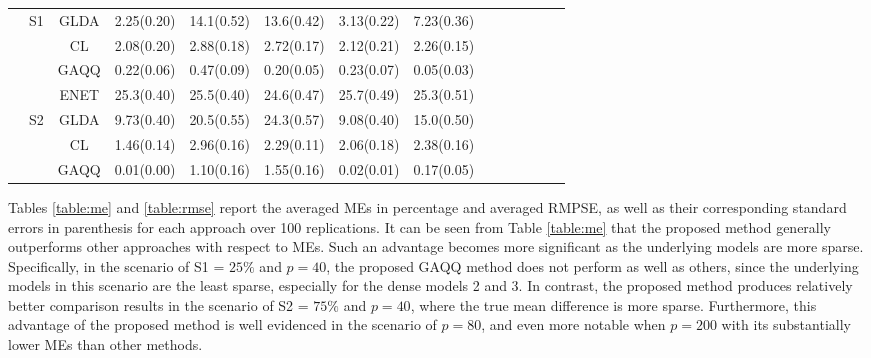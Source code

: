 \documentclass[12pt]{article}
\begin{document}
\begin{table}
\begin{center}
\begin{tabular}{cccrrrrrrrrrrr}
&S1&GLDA&2.25(0.20) &14.1(0.52) &13.6(0.42) &3.13(0.22) &7.23(0.36) \\
&  &CL  &2.08(0.20) &2.88(0.18) &2.72(0.17) &2.12(0.21) &2.26(0.15) \\
&  &GAQQ&0.22(0.06) &0.47(0.09) &0.20(0.05) &0.23(0.07) &0.05(0.03) \\
\hhline{~---------}
&  &ENET&25.3(0.40) &25.5(0.40) &24.6(0.47) &25.7(0.49) &25.3(0.51) \\
&S2&GLDA&9.73(0.40) &20.5(0.55) &24.3(0.57) &9.08(0.40) &15.0(0.50) \\
&  &CL  &1.46(0.14) &2.96(0.16) &2.29(0.11) &2.06(0.18) &2.38(0.16) \\
&  &GAQQ&0.01(0.00) &1.10(0.16) &1.55(0.16) &0.02(0.01) &0.17(0.05) \\
\hline \hline
\end{tabular}
\end{center}
\end{table}

Tables \ref{table:me} and \ref{table:rmse} report the averaged MEs in percentage and averaged RMPSE, as well as their corresponding standard errors in parenthesis for each approach over 100 replications.
It can be seen from Table \ref{table:me} that the proposed method generally outperforms other approaches with respect to MEs.
Such an advantage becomes more significant as the underlying models are more sparse.
Specifically, in the scenario of S1 = $25\%$ and $p = 40$, the proposed GAQQ method does not perform as well as others, since the underlying models in this scenario are the least sparse, especially for the dense models 2 and 3.
In contrast, the proposed method produces relatively better comparison results in the scenario of S2 = $75\%$ and $p = 40$, where the true mean difference is more sparse.
Furthermore, this advantage of the proposed method is well evidenced in the scenario of $p = 80$, and even more notable when $p = 200$ with its substantially lower MEs than other methods.
\end{document}
